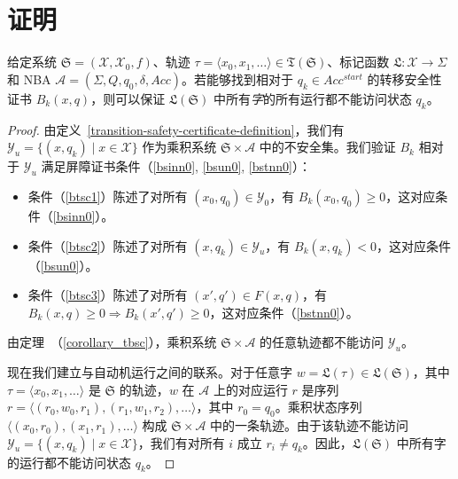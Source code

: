 ﻿\section{证明}
\label{appendix-proof}
\begin{lemma}
  给定系统 $\mathfrak{S} = (\mathcal{X}, \mathcal{X}_0, f)$、轨迹 $\tau=\langle x_0, x_1, \dots \rangle \in \mathfrak{T}(\mathfrak{S})$、标记函数 $\mathfrak{L}:\mathcal{X} \rightarrow \Sigma$ 和 NBA $\mathcal{A}=(\Sigma, Q, q_0, \delta, Acc)$。若能够找到相对于 $q_k \in Acc^{start}$ 的转移安全性证书 $B_{k}(x, q)$，则可以保证 $\mathfrak{L}(\mathfrak{S})$ 中所有\emph{字}的所有运行都不能访问状态 $q_k$。
\end{lemma}

\begin{proof}
  由定义~\ref{transition-safety-certificate-definition}，我们有 $\mathcal{Y}_u = \{(x, q_k) \mid x \in \mathcal{X}\}$ 作为乘积系统 $\mathfrak{S} \times \mathcal{A}$ 中的不安全集。我们验证 $B_k$ 相对于 $\mathcal{Y}_u$ 满足屏障证书条件（\ref{bsinn0}, \ref{bsun0}, \ref{bstnn0}）：
  \begin{itemize}
    \item 条件（\ref{btsc1}）陈述了对所有 $(x_0, q_0) \in \mathcal{Y}_0$，有 $B_k(x_0, q_0) \geq 0$，这对应条件（\ref{bsinn0}）。
    \item 条件（\ref{btsc2}）陈述了对所有 $(x, q_k) \in \mathcal{Y}_u$，有 $B_k(x, q_k) < 0$，这对应条件（\ref{bsun0}）。
    \item 条件（\ref{btsc3}）陈述了对所有 $(x', q') \in F(x, q)$，有 $B_k(x, q) \geq 0 \Rightarrow B_k(x', q') \geq 0$，这对应条件（\ref{bstnn0}）。
  \end{itemize}

  由定理~（\ref{corollary_tbsc}），乘积系统 $\mathfrak{S} \times \mathcal{A}$ 的任意轨迹都不能访问 $\mathcal{Y}_u$。

  现在我们建立与自动机运行之间的联系。对于任意字 $w = \mathfrak{L}(\tau) \in \mathfrak{L}(\mathfrak{S})$，其中 $\tau = \langle x_0, x_1, \dots \rangle$ 是 $\mathfrak{S}$ 的轨迹，$w$ 在 $\mathcal{A}$ 上的对应运行 $r$ 是序列 $r = \langle (r_0, w_0, r_1), (r_1, w_1, r_2), \ldots \rangle$，其中 $r_0 = q_0$。乘积状态序列 $\langle (x_0, r_0), (x_1, r_1), \ldots \rangle$ 构成 $\mathfrak{S} \times \mathcal{A}$ 中的一条轨迹。由于该轨迹不能访问 $\mathcal{Y}_u = \{(x, q_k) \mid x \in \mathcal{X}\}$，我们有对所有 $i$ 成立 $r_i \neq q_k$。因此，$\mathfrak{L}(\mathfrak{S})$ 中所有字的运行都不能访问状态 $q_k$。
\end{proof}

